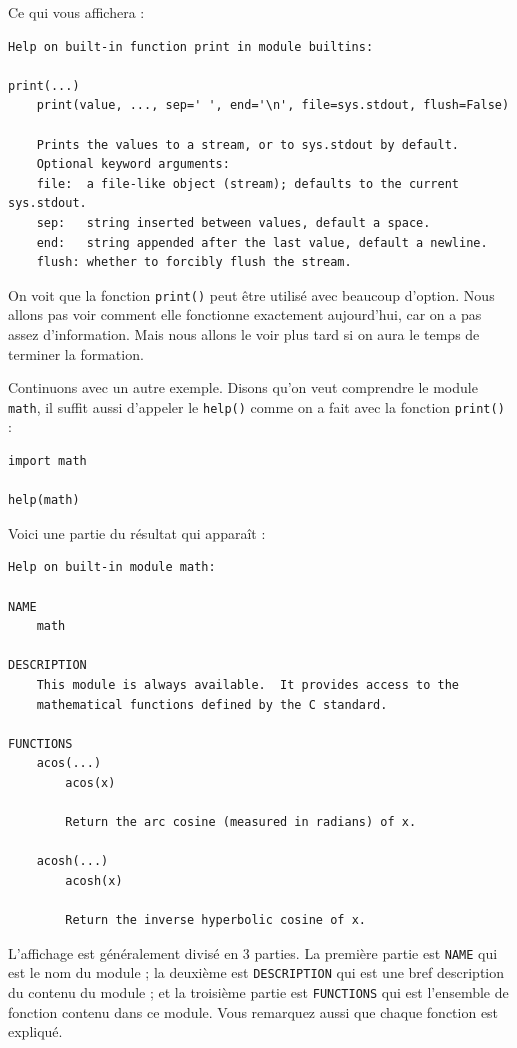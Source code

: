 \documentclass[12pt]{article}
\newcommand{\code}[1]{\colorbox{light-gray}{\texttt{#1}}}
\begin{document}
        Ce qui vous affichera :
        \begin{lstlisting}[style=exec_result]
Help on built-in function print in module builtins:

print(...)
    print(value, ..., sep=' ', end='\n', file=sys.stdout, flush=False)

    Prints the values to a stream, or to sys.stdout by default.
    Optional keyword arguments:
    file:  a file-like object (stream); defaults to the current sys.stdout.
    sep:   string inserted between values, default a space.
    end:   string appended after the last value, default a newline.
    flush: whether to forcibly flush the stream.
        \end{lstlisting}

        On voit que la fonction \code{print()} peut être utilisé avec beaucoup d'option. Nous allons pas voir comment
        elle fonctionne exactement aujourd'hui, car on a pas assez d'information. Mais nous allons le voir plus tard si
        on aura le temps de terminer la formation.

        Continuons avec un autre exemple. Disons qu'on veut comprendre le module \code{math}, il suffit aussi d'appeler
        le \code{help()} comme on a fait avec la fonction \code{print()} :
        \begin{lstlisting}[style=code]
import math

help(math)
        \end{lstlisting}

        Voici une partie du résultat qui apparaît :
        \begin{lstlisting}[style=exec_result]
Help on built-in module math:

NAME
    math

DESCRIPTION
    This module is always available.  It provides access to the
    mathematical functions defined by the C standard.

FUNCTIONS
    acos(...)
        acos(x)

        Return the arc cosine (measured in radians) of x.

    acosh(...)
        acosh(x)

        Return the inverse hyperbolic cosine of x.
        \end{lstlisting}

        L'affichage est généralement divisé en 3 parties. La première partie est \code{NAME} qui est le nom du module ;
        la deuxième est \code{DESCRIPTION} qui est une bref description du contenu du module ; et la troisième partie
        est \code{FUNCTIONS} qui est l'ensemble de fonction contenu dans ce module. Vous remarquez aussi que
        chaque fonction est expliqué.
\end{document}
